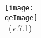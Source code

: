 \begin{center}
\def\version{7.1}
\def\qeImage{../../Doc/quantum_espresso}


  \texttt{[image: \\qeImage]} \\
  
	       \vspace{5.5cm}
  \Huge \intitle\ (v.\version) 
\end{center}
